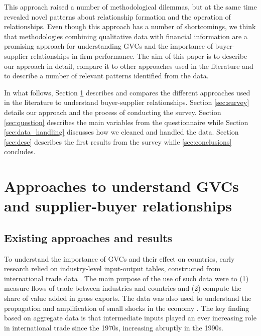 \documentclass[final, dvipsnames, authoryear,12pt]{elsarticle}
\begin{document}
This approach raised a number of methodological dilemmas, but at the same time revealed novel patterns about relationship formation and the operation of relationships. Even though this approach has a number of shortcomings, we think that methodologies combining qualitative data with financial information are a promising approach for understanding GVCs and the importance of buyer-supplier relationships in firm performance. The aim of this paper is to describe our approach in detail, compare it to other approaches used in the literature and to describe a number of relevant patterns identified from the data. 

In what follows, Section \ref{sec: approach} describes and compares the different approaches used in the literature to understand buyer-supplier relationships. Section \ref{sec:survey} details our approach and the process of conducting the survey. Section \ref{sec:question} describes the main variables from the questionnaire while Section \ref{sec:data_handling} discusses how we cleaned and handled the data. Section \ref{sec:desc} describes the first results from the survey while \ref{sec:conclusions} concludes.  

\section{Approaches to understand GVCs and supplier-buyer relationships} 
\label{sec: approach}

\subsection{Existing approaches and results}

To understand the importance of GVCs and their effect on countries, early research relied on industry-level input-output tables, constructed from international trade data \citep{johnson2012accounting, hummels2001nature}. The main purpose of the use of such data were to (1) measure flows of trade between industries and countries and (2) compute the share of value added in gross exports. The data was also used to understand the propagation and amplification of small shocks in the economy \citep{acemoglu2016networks}. The key finding based on aggregate data is that intermediate inputs played an ever increasing role in international trade since the 1970s, increasing abruptly in the 1990s. 
\end{document}
